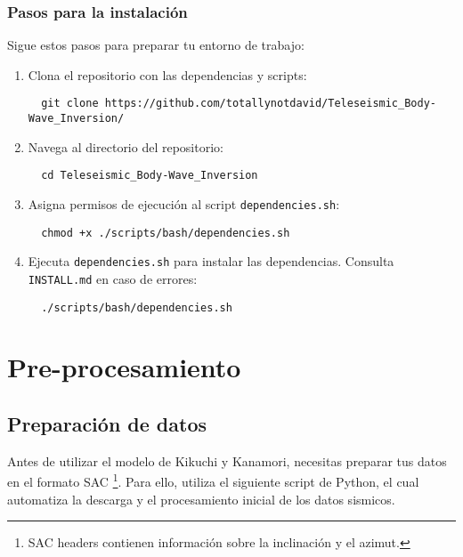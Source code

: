 \documentclass[a4paper,11pt]{refart}
\begin{document}
\subsubsection{Pasos para la instalación}

Sigue estos pasos para preparar tu entorno de trabajo:

\begin{enumerate}
  \item Clona el repositorio con las dependencias y scripts:
  \begin{verbatim}
  git clone https://github.com/totallynotdavid/Teleseismic_Body-Wave_Inversion/
  \end{verbatim}

  \item Navega al directorio del repositorio:
  \begin{verbatim}
  cd Teleseismic_Body-Wave_Inversion
  \end{verbatim}

  \item Asigna permisos de ejecución al script \texttt{dependencies.sh}:
  \begin{verbatim}
  chmod +x ./scripts/bash/dependencies.sh
  \end{verbatim}

  \item Ejecuta \texttt{dependencies.sh} para instalar las dependencias. Consulta \texttt{INSTALL.md} en caso de errores:
  \begin{verbatim}
  ./scripts/bash/dependencies.sh
  \end{verbatim}
\end{enumerate}

\section{Pre-procesamiento}

\subsection{Preparación de datos}

Antes de utilizar el modelo de Kikuchi y Kanamori, necesitas preparar tus datos en el formato SAC \footnote{SAC headers contienen información sobre la inclinación y el azimut.}. Para ello, utiliza el siguiente script de Python, el cual automatiza la descarga y el procesamiento inicial de los datos sismicos.
\end{document}
